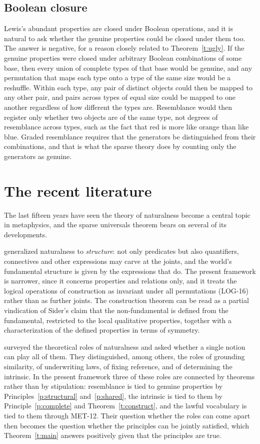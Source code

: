 \documentclass{situationist-preprint}
\begin{document}
\subsection{Boolean closure}

Lewis's abundant properties are closed under Boolean operations, and it is natural to ask whether the genuine properties could be closed under them too. The answer is negative, for a reason closely related to Theorem~\ref{t:ugly}. If the genuine properties were closed under arbitrary Boolean combinations of some base, then every union of complete types of that base would be genuine, and any permutation that maps each type onto a type of the same size would be a reshuffle. Within each type, any pair of distinct objects could then be mapped to any other pair, and pairs across types of equal size could be mapped to one another regardless of how different the types are. Resemblance would then register only whether two objects are of the same type, not degrees of resemblance across types, such as the fact that red is more like orange than like blue. Graded resemblance requires that the generators be distinguished from their combinations, and that is what the sparse theory does by counting only the generators as genuine.

\section{The recent literature}\label{s:recent}

The last fifteen years have seen the theory of naturalness become a central topic in metaphysics, and the sparse universals theorem bears on several of its developments.

\citet{Sider2011} generalized naturalness to \emph{structure}: not only predicates but also quantifiers, connectives and other expressions may carve at the joints, and the world's fundamental structure is given by the expressions that do. The present framework is narrower, since it concerns properties and relations only, and it treats the logical operations of construction as invariant under all permutations (LOG-16) rather than as further joints. The construction theorem can be read as a partial vindication of Sider's claim that the non-fundamental is defined from the fundamental, restricted to the local qualitative properties, together with a characterization of the defined properties in terms of symmetry.

\citet{DorrHawthorne2013} surveyed the theoretical roles of naturalness and asked whether a single notion can play all of them. They distinguished, among others, the roles of grounding similarity, of underwriting laws, of fixing reference, and of determining the intrinsic. In the present framework three of these roles are connected by theorems rather than by stipulation: resemblance is tied to genuine properties by Principles~\ref{p:structural} and~\ref{p:shared}, the intrinsic is tied to them by Principle~\ref{p:complete} and Theorem~\ref{t:construct}, and the lawful vocabulary is tied to them through MET-12. Their question whether the roles can come apart then becomes the question whether the principles can be jointly satisfied, which Theorem~\ref{t:main} answers positively given that the principles are true.
\end{document}
